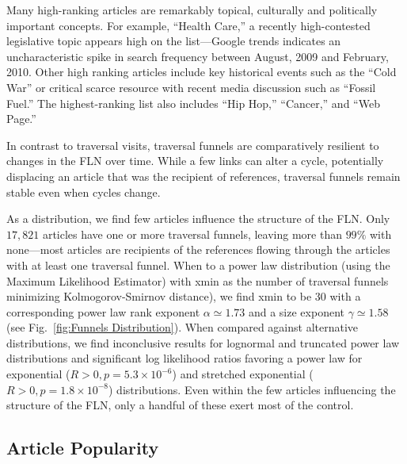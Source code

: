 \documentclass[pre,twocolumn,twoside,superscriptaddress,floatfix]{revtex4-1}
\begin{document}
{Many high-ranking articles are remarkably topical, culturally and politically important concepts.  For example, ``Health Care,'' a recently high-contested legislative topic appears high on the list---Google trends indicates an uncharacteristic spike in search frequency between August, 2009 and February, 2010.
Other high ranking articles include key historical events such as the ``Cold War'' or critical scarce resource with recent 
media discussion such as ``Fossil Fuel.'' 
The highest-ranking list also includes ``Hip Hop,'' ``Cancer,'' and ``Web Page.''

In contrast to traversal visits, traversal funnels are comparatively resilient to changes in the FLN over time. 
While a few links can alter a cycle, potentially displacing an article that was the recipient of references, traversal funnels remain stable even when cycles change.

As a distribution, we find few articles influence the structure of the 
FLN. Only $17, 821$ articles have one or more traversal funnels, leaving
more than $99\%$ with none---most articles are recipients of 
the references flowing through the articles with at least one traversal funnel.
When to a power law 
    distribution (using the Maximum Likelihood Estimator) with xmin as the number of traversal funnels minimizing Kolmogorov-Smirnov distance), we find xmin to be 30 with a corresponding power law rank exponent $\alpha \simeq 1.73$ and a size exponent $\gamma \simeq 1.58$
(see Fig.~\ref{fig:Funnels Distribution}). 
When compared against alternative distributions, we find inconclusive results for lognormal and truncated power law distributions and significant log likelihood ratios favoring a power law for exponential ($R>0, p=5.3\times10^{-6}$) and stretched exponential ($R>0, p = 1.8\times10^{-8}$) distributions.
Even within the few articles
influencing the structure of the FLN, only a handful of these exert most of the 
control. 

\subsection{Article Popularity}

}
\end{document}
